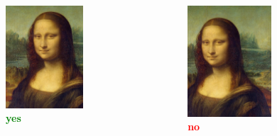 \documentclass[hyperref={pdfpagelabels=false},aspectratio=169]{beamer}
\begin{document}
\begin{frame} 		%
	\begin{columns}[T,onlytextwidth]
	\begin{figure} 
		\centering
		\def\svgwidth{1\textwidth}
		\includegraphics[width=0.7\textwidth]{in_bild_gucken.jpg} \\
		\textcolor{green}{\textbf{yes}}	
	\end{figure}
	\begin{figure} 
		\centering
		\def\svgwidth{1\textwidth}
		\includegraphics[width=0.7\textwidth]{aus_bild_gucken.jpg} \\
		\textcolor{red}{\textbf{no}}	
	\end{figure}
\end{columns}
\end{frame}
\end{document}
